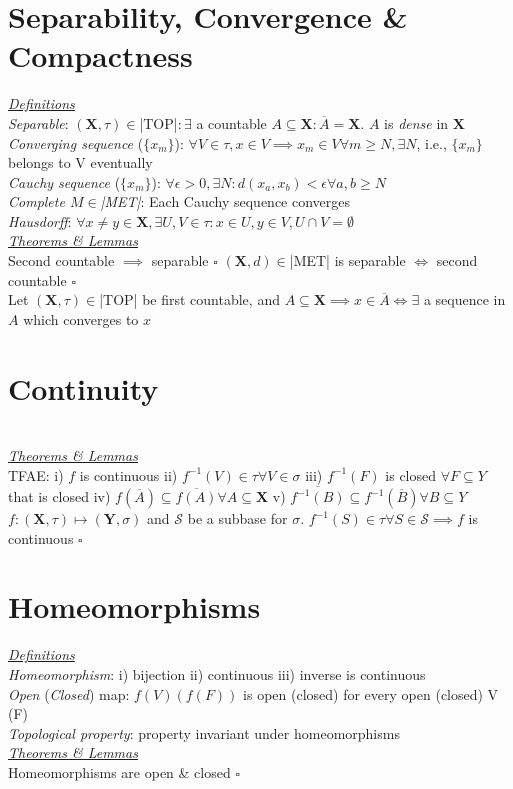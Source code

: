 \section{Separability, Convergence \& Compactness}
\underline{\emph{Definitions}}\\
\emph{Separable}: $(\mathbf{X},\tau)\in$|TOP|$:\exists$ a countable $A\subseteq\mathbf{X}:\overline{A}=\mathbf{X}$. $A$ is \emph{dense} in $\mathbf{X}$\\
\emph{Converging sequence} ($\{x_m\}$): $\forall V\in\tau,x\in V\implies x_m\in V \forall m\geq N,\exists N$, i.e., $\{x_m\}$ belongs to V eventually\\
\emph{Cauchy sequence} ($\{x_m\}$): $\forall\epsilon>0,\exists N:d(x_a,x_b)<\epsilon\forall a,b\geq N$\\
\emph{Complete $M\in$|MET|}: Each Cauchy sequence converges\\
\emph{Hausdorff}: $\forall x\neq y\in\mathbf{X},\exists U,V\in\tau:x\in U,y\in V, U\cap V=\emptyset$
\\\underline{\emph{Theorems \& Lemmas}}\\
Second countable $\implies$ separable $\square$
$(\mathbf{X},d)\in$|MET| is separable $\iff$ second countable $\square$\\
Let $(\mathbf{X},\tau)\in$|TOP| be first countable, and $A\subseteq\mathbf{X}\implies x\in\overline{A}\iff\exists$ a sequence in $A$ which converges to $x$
\section{Continuity}
\\\underline{\emph{Theorems \& Lemmas}}\\
TFAE: i) $f$ is continuous ii) $f^{-1}(V)\in\tau\forall V \in\sigma$ iii) $f^{-1}(F)$ is closed $\forall F\subseteq Y$ that is closed iv) $f(\overline{A})\subseteq \overline{f(A)}\forall A\subseteq\mathbf{X}$ v) $\overline{f^{-1}(B)}\subseteq f^{-1}(\overline{B})\forall B\subseteq Y$ \square\\
$f:(\mathbf{X},\tau)\mapsto(\mathbf{Y},\sigma)$ and $\mathcal{S}$ be a subbase for $\sigma$. $f^{-1}(S)\in\tau   \forall S\in\mathcal{S}\implies f$ is continuous $\square$
\section{Homeomorphisms}
\underline{\emph{Definitions}}\\
\emph{Homeomorphism}: i) bijection ii) continuous iii) inverse is continuous\\
\emph{Open} (\emph{Closed}) map: $f(V) (f(F))$ is open (closed) for every open (closed) V (F)\\
\emph{Topological property}: property invariant under homeomorphisms
\\\underline{\emph{Theorems \& Lemmas}}\\
Homeomorphisms are open \& closed $\square$
